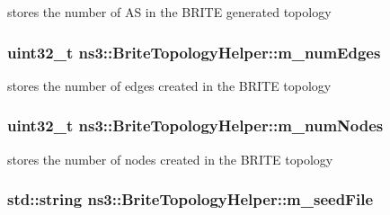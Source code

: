 stores the number of AS in the B\+R\+I\+TE generated topology 

\subsubsection[{\texorpdfstring{m\+\_\+num\+Edges}{m_numEdges}}]{\setlength{\rightskip}{0pt plus 5cm}uint32\+\_\+t ns3\+::\+Brite\+Topology\+Helper\+::m\+\_\+num\+Edges\hspace{0.3cm}{\ttfamily [private]}}\hypertarget{classns3_1_1BriteTopologyHelper_a3b6ab85e6ae0761f2936ae0f3b4c65da}{}\label{classns3_1_1BriteTopologyHelper_a3b6ab85e6ae0761f2936ae0f3b4c65da}


stores the number of edges created in the B\+R\+I\+TE topology 

\subsubsection[{\texorpdfstring{m\+\_\+num\+Nodes}{m_numNodes}}]{\setlength{\rightskip}{0pt plus 5cm}uint32\+\_\+t ns3\+::\+Brite\+Topology\+Helper\+::m\+\_\+num\+Nodes\hspace{0.3cm}{\ttfamily [private]}}\hypertarget{classns3_1_1BriteTopologyHelper_a19e2e5830df1074b65acadb096ef054f}{}\label{classns3_1_1BriteTopologyHelper_a19e2e5830df1074b65acadb096ef054f}


stores the number of nodes created in the B\+R\+I\+TE topology 

\subsubsection[{\texorpdfstring{m\+\_\+seed\+File}{m_seedFile}}]{\setlength{\rightskip}{0pt plus 5cm}std\+::string ns3\+::\+Brite\+Topology\+Helper\+::m\+\_\+seed\+File\hspace{0.3cm}{\ttfamily [private]}}\hypertarget{classns3_1_1BriteTopologyHelper_a946a7f28cc74c10675d9874b1ee2fe9b}{}\label{classns3_1_1BriteTopologyHelper_a946a7f28cc74c10675d9874b1ee2fe9b}


